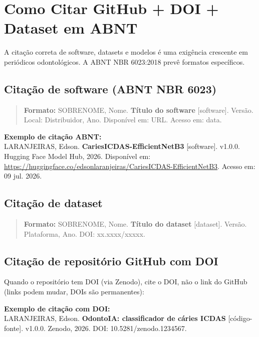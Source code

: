 \section{Como Citar GitHub + DOI + Dataset em ABNT}

A citação correta de software, datasets e modelos é uma exigência
crescente em periódicos odontológicos. A ABNT NBR 6023:2018 prevê
formatos específicos.

\subsection{Citação de software (ABNT NBR 6023)}

\begin{quote}
  \textbf{Formato:} SOBRENOME, Nome. \textbf{Título do software}
  [software]. Versão. Local: Distribuidor, Ano. Disponível em: URL.
  Acesso em: data.
\end{quote}

\begin{mdframed}[linecolor=corSecundaria, linewidth=1pt, backgroundcolor=corSecundaria!5, roundcorner=4pt]
  \textbf{Exemplo de citação ABNT:} \\
  LARANJEIRAS, Edson. \textbf{CariesICDAS-EfficientNetB3} [software].
  v1.0.0. Hugging Face Model Hub, 2026. Disponível em:
  \url{https://huggingface.co/edsonlaranjeiras/CariesICDAS-EfficientNetB3}.
  Acesso em: 09 jul. 2026.
\end{mdframed}

\subsection{Citação de dataset}

\begin{quote}
  \textbf{Formato:} SOBRENOME, Nome. \textbf{Título do dataset} [dataset].
  Versão. Plataforma, Ano. DOI: xx.xxxx/xxxxx.
\end{quote}

\subsection{Citação de repositório GitHub com DOI}

Quando o repositório tem DOI (via Zenodo), cite o DOI, não o link do
GitHub (links podem mudar, DOIs são permanentes):

\begin{mdframed}[linecolor=corSecundaria, linewidth=1pt, backgroundcolor=corSecundaria!5, roundcorner=4pt]
  \textbf{Exemplo de citação com DOI:} \\
  LARANJEIRAS, Edson. \textbf{OdontoIA: classificador de cáries ICDAS}
  [código-fonte]. v1.0.0. Zenodo, 2026. DOI: 10.5281/zenodo.1234567.
\end{mdframed}

